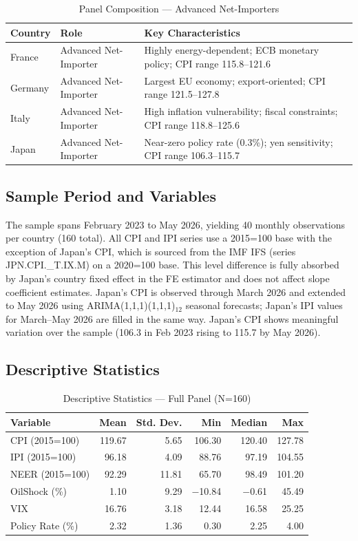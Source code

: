 \documentclass[11pt,a4paper]{article}
\begin{document}
\begin{table}[H]
\caption{Panel Composition --- Advanced Net-Importers}
\centering\small
\begin{tabular}{|p{2cm}|p{3.6cm}|p{8cm}|}
\hline
\textbf{Country} & \textbf{Role} & \textbf{Key Characteristics}\\\hline
France & Advanced Net-Importer & Highly energy-dependent; ECB monetary policy; CPI range 115.8--121.6\\\hline
Germany & Advanced Net-Importer & Largest EU economy; export-oriented; CPI range 121.5--127.8\\\hline
Italy & Advanced Net-Importer & High inflation vulnerability; fiscal constraints; CPI range 118.8--125.6\\\hline
Japan & Advanced Net-Importer & Near-zero policy rate (0.3\%); yen sensitivity; CPI range 106.3--115.7\\\hline
\end{tabular}
\end{table}

\subsection{Sample Period and Variables}
The sample spans February 2023 to May 2026, yielding 40 monthly observations per country (160 total). All CPI and IPI series use a 2015=100 base with the exception of Japan's CPI, which is sourced from the IMF IFS (series JPN.CPI.\_T.IX.M) on a 2020=100 base. This level difference is fully absorbed by Japan's country fixed effect in the FE estimator and does not affect slope coefficient estimates. Japan's CPI is observed through March 2026 and extended to May 2026 using ARIMA(1,1,1)(1,1,1)$_{12}$ seasonal forecasts; Japan's IPI values for March--May 2026 are filled in the same way. Japan's CPI shows meaningful variation over the sample (106.3 in Feb 2023 rising to 115.7 by May 2026).

\subsection{Descriptive Statistics}
\begin{table}[H]
\caption{Descriptive Statistics --- Full Panel (N=160)}
\centering\small
\begin{tabular}{|l|r|r|r|r|r|}
\hline
\textbf{Variable} & \textbf{Mean} & \textbf{Std. Dev.} & \textbf{Min} & \textbf{Median} & \textbf{Max}\\\hline
CPI (2015=100) & 119.67 & 5.65 & 106.30 & 120.40 & 127.78\\\hline
IPI (2015=100) & 96.18 & 4.09 & 88.76 & 97.19 & 104.55\\\hline
NEER (2015=100) & 92.29 & 11.81 & 65.70 & 98.49 & 101.20\\\hline
OilShock (\%) & 1.10 & 9.29 & $-$10.84 & $-$0.61 & 45.49\\\hline
VIX & 16.76 & 3.18 & 12.44 & 16.58 & 25.25\\\hline
Policy Rate (\%) & 2.32 & 1.36 & 0.30 & 2.25 & 4.00\\\hline
\end{tabular}
\end{table}
\end{document}
